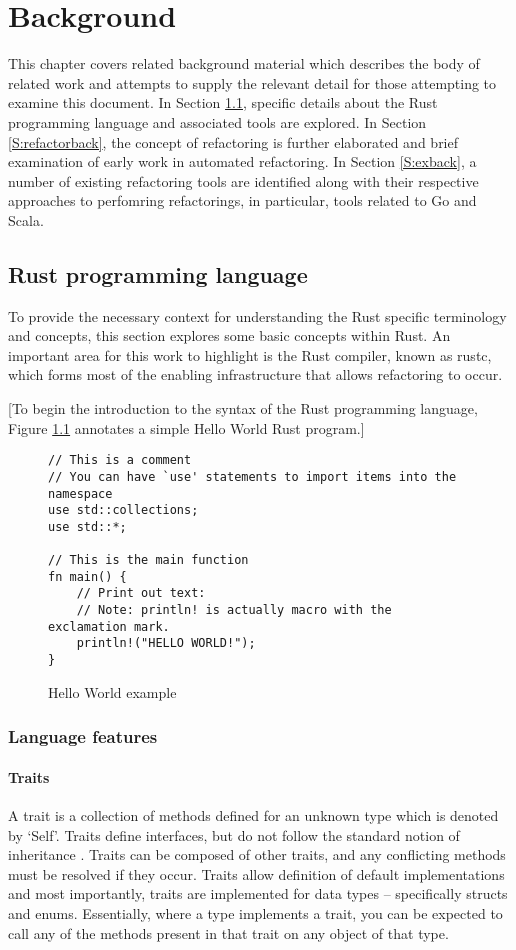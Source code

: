 \chapter{Background}\label{C:back} 
This chapter covers related background material which describes the body of related work and attempts to supply the relevant detail for those attempting to examine this document. In Section \ref{S:rustback}, specific details about the Rust programming language and associated tools are explored. In Section \ref{S:refactorback}, the concept of refactoring is further elaborated and brief examination of early work in automated refactoring. In Section \ref{S:exback}, a number of existing refactoring tools are identified along with their respective approaches to perfomring refactorings, in particular, tools related to Go and Scala. 

\section{Rust programming language}\label{S:rustback}
To provide the necessary context for understanding the Rust specific terminology and concepts, this section explores some basic concepts within Rust. An important area for this work to highlight is the Rust compiler, known as rustc, which forms most of the enabling infrastructure that allows refactoring to occur.

[To begin the introduction to the syntax of the Rust programming language, Figure \ref{Fig:hello} annotates a simple Hello World Rust program.]

\begin{figure}[H]
\centering
\begin{verbatim}
// This is a comment
// You can have `use' statements to import items into the namespace
use std::collections;
use std::*;

// This is the main function
fn main() {
    // Print out text:
    // Note: println! is actually macro with the exclamation mark.
    println!("HELLO WORLD!");
}
\end{verbatim}
\caption{Hello World example}
\label{Fig:hello}
\end{figure}

\subsection{Language features}
\subsubsection{Traits}
A trait is a collection of methods defined for an unknown type which is denoted by `Self'. Traits define interfaces, but do not follow the standard notion of inheritance \cite{traitexample15}. Traits can be composed of other traits, and any conflicting methods must be resolved if they occur. Traits allow definition of default implementations and most importantly, traits are implemented for data types -- specifically structs and enums. Essentially, where a type implements a trait, you can be expected to call any of the methods present in that trait on any object of that type. 

